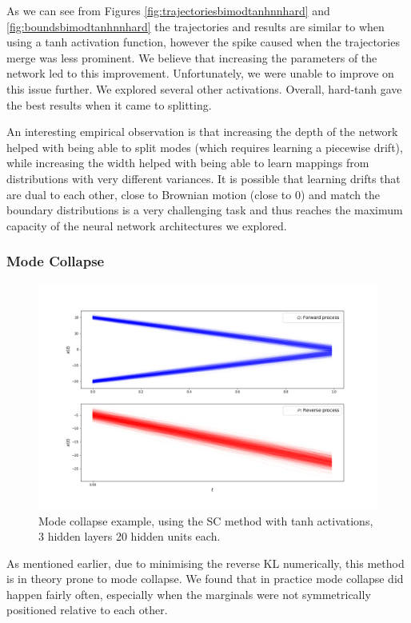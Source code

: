 \documentclass[a4paper,12pt,twoside,openright]{report}
\theoremstyle{definition}
\begin{document}
As we can see from Figures \ref{fig:trajectoriesbimodtanhnnhard} and \ref{fig:boundsbimodtanhnnhard} the trajectories and results are similar to when using a tanh activation function, however the spike caused when the trajectories merge was less prominent. We believe that increasing the parameters of the network led to this improvement. Unfortunately, we were unable to improve on this issue further.  We explored several other activations. Overall, hard-tanh gave the best results when it came to splitting.

An interesting empirical observation is that increasing the depth of the network helped with being able to split modes (which requires learning a piecewise drift), while increasing the width helped with being  able to learn mappings from distributions with very different  variances. It is possible that learning drifts that are dual to each other, close to Brownian motion (close to 0) and match the boundary distributions is a very challenging task and thus reaches the maximum capacity of the neural network architectures we explored.
\subsubsection{Mode Collapse}
\begin{figure}[t]
    \centering
    \includegraphics[scale=0.4,trim={2.3cm 1cm 2.5cm 0}, clip]{images/Control/mode_colapse_final_relu_trajectories.png}
    \caption{ Mode collapse example, using the SC method with tanh activations, 3 hidden layers 20 hidden units each.}
    \label{fig:trajectoriesmodecop}
\end{figure}
As mentioned earlier, due to minimising the reverse KL numerically, this method is in theory prone to mode collapse. We found that in practice mode collapse did happen fairly often, especially when the marginals were not symmetrically positioned relative to each other. 
\end{document}
